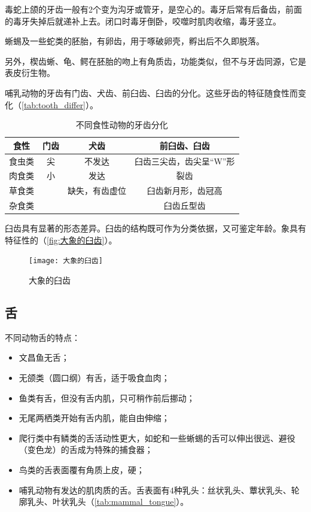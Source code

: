 毒蛇上颌的牙齿一般有2个变为沟牙或管牙，是空心的。毒牙后常有后备齿，前面的毒牙失掉后就递补上去。闭口时毒牙倒卧，咬噬时肌肉收缩，毒牙竖立。

蜥蜴及一些蛇类的胚胎，有卵齿，用于啄破卵壳，孵出后不久即脱落。

另外，楔齿蜥、龟、鳄在胚胎的吻上有角质齿，功能类似，但不与牙齿同源，它是表皮衍生物。

哺乳动物的牙齿有门齿、犬齿、前臼齿、臼齿的分化。这些牙齿的特征随食性而变化（\autoref{tab:tooth_differ}）。

\begin{table}[h]
	\centering
	\begin{NiceTabularX}{\textwidth}{|c|c|c|C|}
		\hline
		食性 & 门齿 & 犬齿 & 前臼齿、臼齿 \\ \hline
		食虫类 & 尖 & 不发达 & 臼齿三尖齿，齿尖呈“W”形 \\ \hline
		肉食类 & 小 & 发达 & 裂齿 \\ \hline
		草食类 &  & 缺失，有齿虚位 & 臼齿新月形，齿冠高 \\ \hline
		杂食类 &  &  & 臼齿丘型齿 \\ \hline
	\end{NiceTabularX}
	\caption{不同食性动物的牙齿分化}
	\label{tab:tooth_differ}
\end{table}

臼齿具有显著的形态差异。臼齿的结构既可作为分类依据，又可鉴定年龄。象具有特征性的（\autoref{fig:大象的臼齿}）。

\begin{figure}[htbp]
	\centering
	\texttt{[image: 大象的臼齿]}
	\caption{大象的臼齿}
	\label{fig:大象的臼齿}
\end{figure}


\subsection{舌}

不同动物舌的特点：

\begin{itemize}
	\item 文昌鱼无舌；
	\item 无颌类（圆口纲）有舌，适于吸食血肉；
	\item 鱼类有舌，但没有舌内肌，只可稍作前后挪动；
	\item 无尾两栖类开始有舌内肌，能自由伸缩；
	\item 爬行类中有鳞类的舌活动性更大，如蛇和一些蜥蜴的舌可以伸出很远、避役（变色龙）的舌成为特殊的捕食器；
	\item 鸟类的舌表面覆有角质上皮，硬；
	\item 哺乳动物有发达的肌肉质的舌。舌表面有4种乳头：丝状乳头、蕈状乳头、轮廓乳头、叶状乳头（\autoref{tab:mammal_tongue}）。
\end{itemize}



